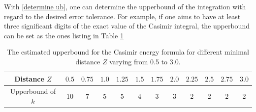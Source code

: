 With \eqref{determine ub}, one can determine the upperbound of the integration with regard to the desired error tolerance. For example, if one aims to have at least three significant digits of the exact value of the Casimir integral, the upperbound can be set as the ones listing in Table \ref{Table: scalar upperbound same radii}
\begin{table}[H]
 \centering
 \begin{tabular}{ ||c||c|c|c|c|c|c|c|c|c|c|c| }
     \hline
     Distance $Z$ & $ 0.5$ & $ 0.75$  & $ 1.0$ & $1.25$ & $ 1.5$ & $1.75$  & $2.0$ & $2.25$ & $ 2.5$ & $ 2.75$  & $3.0$ \\\hline
     Upperbound of $k$ & $10$ & $7$ & $5$ & $5$ & $4$ & $3$ & $3$ & $2$ & $2$ & $2$ & $2$ \\\hline
    \end{tabular}
    \bigskip
    \caption{\label{Equal: distance and upperbound error tolerance} The estimated upperbound for the Casimir energy formula for different minimal distance $Z$ varying from 
    0.5 to 3.0.}
    \label{Table: scalar upperbound same radii}
\end{table}



